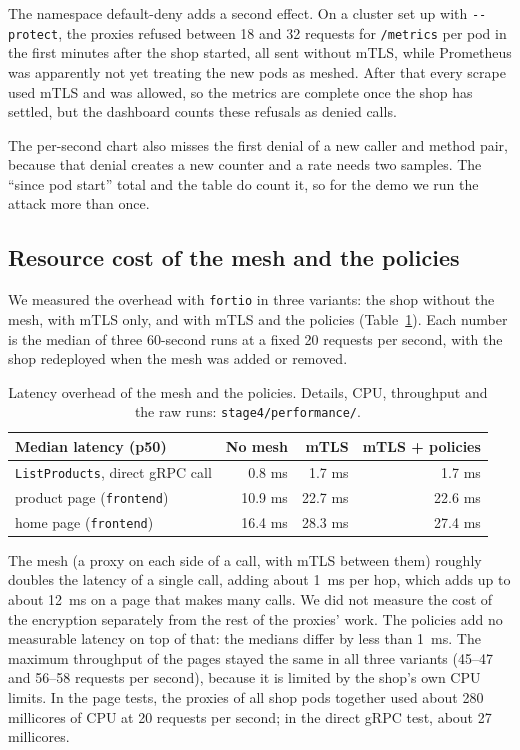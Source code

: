\documentclass[12pt,a4paper]{article}
\begin{document}
The namespace default-deny adds a second effect. On a cluster set up with
\texttt{-{}-protect}, the proxies refused between 18 and 32 requests for
\texttt{/metrics} per pod in the first minutes after the shop started, all
sent without mTLS, while Prometheus was apparently not yet treating the new
pods as meshed. After that every scrape used mTLS and was allowed, so the
metrics are complete once the shop has settled, but the dashboard counts
these refusals as denied calls.

The per-second chart also misses the first denial of a new caller and method
pair, because that denial creates a new counter and a rate needs two samples.
The ``since pod start'' total and the table do count it, so for the demo we
run the attack more than once.

\subsection*{Resource cost of the mesh and the policies}

We measured the overhead with \texttt{fortio} in three variants: the shop
without the mesh, with mTLS only, and with mTLS and the policies
(Table~\ref{tab:perf}). Each number is the median of three 60-second runs at
a fixed 20 requests per second, with the shop redeployed when the mesh was
added or removed.

\begin{table}[H]
  \centering
  \small
  \begin{tabular}{lrrr}
    \toprule
    Median latency (p50) & No mesh & mTLS & mTLS + policies \\
    \midrule
    \texttt{ListProducts}, direct gRPC call & 0.8 ms  & 1.7 ms  & 1.7 ms \\
    product page (\texttt{frontend})       & 10.9 ms & 22.7 ms & 22.6 ms \\
    home page (\texttt{frontend})          & 16.4 ms & 28.3 ms & 27.4 ms \\
    \bottomrule
  \end{tabular}
  \caption{Latency overhead of the mesh and the policies. Details, CPU,
    throughput and the raw runs: \texttt{stage4/performance/}.}
  \label{tab:perf}
\end{table}

The mesh (a proxy on each side of a call, with mTLS between them) roughly
doubles the latency of a single call, adding about 1~ms per hop, which adds up
to about 12~ms on a page that makes many calls. We did not measure the cost of
the encryption separately from the rest of the proxies' work. The policies
add no measurable latency on top of that: the medians differ by less than
1~ms. The maximum throughput of the pages stayed the same in all three
variants (45--47 and 56--58 requests per second), because it is limited by
the shop's own CPU limits. In the page tests, the proxies of all shop pods
together used about 280 millicores of CPU at 20 requests per second; in the
direct gRPC test, about 27 millicores.
\end{document}
